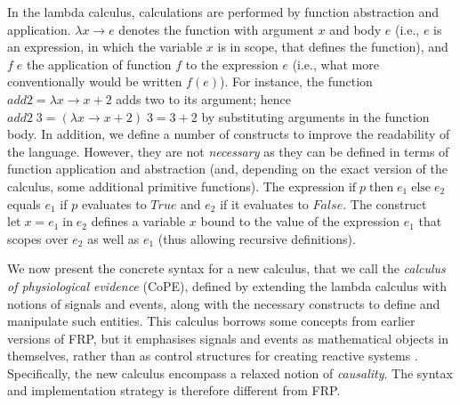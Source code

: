 \documentclass[11pt]{article}
\newcommand{\Conid}[1]{\mathit{#1}}
\newcommand{\Varid}[1]{\mathit{#1}}
\begin{document}
In the lambda calculus, calculations are performed by function
abstraction and application. \ensuremath{\lambda \Varid{x}\to \Varid{e}} denotes the function with
argument \ensuremath{\Varid{x}} and body \ensuremath{\Varid{e}} (i.e., \ensuremath{\Varid{e}} is an expression, in which the
variable \ensuremath{\Varid{x}} is in scope, that defines the function), and \ensuremath{\Varid{f}\;\Varid{e}} the
application of function \ensuremath{\Varid{f}} to the
expression \ensuremath{\Varid{e}} (i.e., what more conventionally would be written
$f(e)$). For instance, the function \ensuremath{\Varid{add2}\mathrel{=}\lambda \Varid{x}\to \Varid{x}\mathbin{+}\mathrm{2}} adds two to its
argument; hence \ensuremath{\Varid{add2}\;\mathrm{3}\mathrel{=}(\lambda \Varid{x}\to \Varid{x}\mathbin{+}\mathrm{2})\;\mathrm{3}\mathrel{=}\mathrm{3}\mathbin{+}\mathrm{2}} by substituting arguments
in the function body. In addition, we define a number of constructs to
improve the readability of the language. However, they are not
\emph{necessary} as they can be defined in terms of function
application and abstraction (and, depending on the exact version of
the calculus, some additional primitive functions). The expression \ensuremath{\textrm {if}\;\Varid{p}\;\textrm {then}\;e_1\;\textrm {else}\;e_2} equals \ensuremath{e_1} if \ensuremath{\Varid{p}} evaluates to \ensuremath{\Conid{True}} and \ensuremath{e_2}
if it evaluates to \ensuremath{\Conid{False}}.  The construct \ensuremath{\textrm {let}\;\Varid{x}\mathrel{=}e_1\;\textrm {in}\;e_2} defines
a variable \ensuremath{\Varid{x}} bound to the value of the expression \ensuremath{e_1} that scopes
over \ensuremath{e_2} as well as \ensuremath{e_1} (thus allowing recursive definitions).

We now present the concrete syntax for a new calculus, that we call
the \emph{calculus of physiological evidence} (CoPE), defined by
extending the lambda calculus with notions of signals and events,
along with the necessary constructs to define and manipulate such
entities. This calculus borrows some concepts from earlier versions of
FRP, but it emphasises signals and events as mathematical objects in
themselves, rather than as control structures for creating reactive
systems \cite{Elliott1997, Nilsson2002}. Specifically, the new calculus
encompass a relaxed notion of \emph{causality}. The syntax and
implementation strategy is therefore different from FRP.
\end{document}
